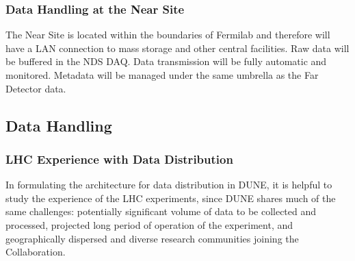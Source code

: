 \subsubsection{Data Handling at the Near Site}
The Near Site is located within the boundaries of Fermilab and therefore will have a LAN connection to mass storage
and other central facilities. Raw data will be buffered in the NDS DAQ. Data transmission will be fully automatic and monitored.
Metadata will be managed under the same umbrella as the Far Detector data.


\subsection{Data Handling}
\subsubsection{LHC Experience with Data Distribution}

In formulating the architecture for data distribution in DUNE, it is helpful to study the experience of the LHC experiments,
since DUNE shares much of the same challenges: potentially significant  volume of data to be collected and processed,
projected long period of operation of the experiment, and geographically dispersed and diverse research communities joining the Collaboration.

